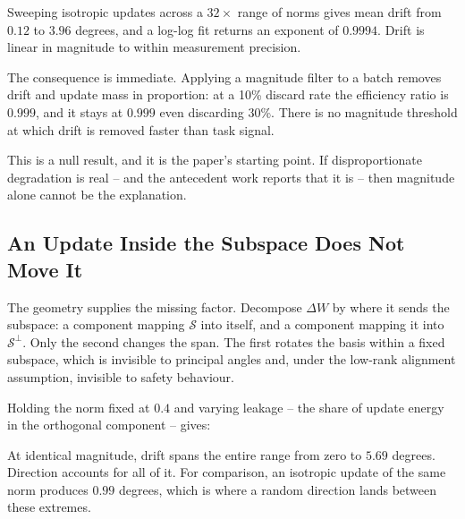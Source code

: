 \documentclass[10pt,journal,compsoc,twocolumn]{IEEEtran}
\begin{document}
Sweeping isotropic updates across a $32\times$ range of norms gives mean drift from $0.12$ to $3.96$ degrees, and a log-log fit returns an exponent of $0.9994$. Drift is linear in magnitude to within measurement precision.

The consequence is immediate. Applying a magnitude filter to a batch removes drift and update mass in proportion: at a 10\% discard rate the efficiency ratio is $0.999$, and it stays at $0.999$ even discarding 30\%. There is no magnitude threshold at which drift is removed faster than task signal.

This is a null result, and it is the paper's starting point. If disproportionate degradation is real -- and the antecedent work reports that it is -- then magnitude alone cannot be the explanation.


\subsection{An Update Inside the Subspace Does Not Move It}


The geometry supplies the missing factor. Decompose $\Delta W$ by where it sends the subspace: a component mapping $\mathcal{S}$ into itself, and a component mapping it into $\mathcal{S}^{\perp}$. Only the second changes the span. The first rotates the basis within a fixed subspace, which is invisible to principal angles and, under the low-rank alignment assumption, invisible to safety behaviour.

Holding the norm fixed at $0.4$ and varying leakage -- the share of update energy in the orthogonal component -- gives:
\begin{table}[htbp]
\centering
{}
\end{table}

At identical magnitude, drift spans the entire range from zero to $5.69$ degrees. Direction accounts for all of it. For comparison, an isotropic update of the same norm produces $0.99$ degrees, which is where a random direction lands between these extremes.
\end{document}
